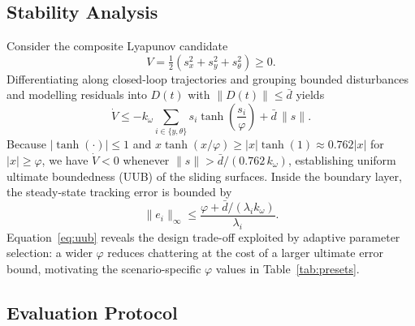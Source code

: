 \documentclass[11pt,a4paper]{article}
\newcommand{\bd}{\bar{d}}
\begin{document}
\subsection{Stability Analysis}

Consider the composite Lyapunov candidate
\begin{equation}
    V = \tfrac{1}{2}\left( s_x^2 + s_y^2 + s_\theta^2 \right) \geq 0 .
    \label{eq:lyapunov}
\end{equation}
Differentiating along closed-loop trajectories and grouping bounded disturbances and
modelling residuals into $D(t)$ with $\|D(t)\| \leq \bd$ yields
\begin{equation}
    \dot{V} \leq -k_\omega \sum_{i \in \{y, \theta\}} s_i
        \tanh\!\left(\frac{s_i}{\varphi}\right) + \bd\, \|s\| .
    \label{eq:vdot}
\end{equation}
Because $|\tanh(\cdot)| \leq 1$ and $x\tanh(x/\varphi) \geq |x|\tanh(1) \approx 0.762|x|$
for $|x| \geq \varphi$, we have $\dot{V} < 0$ whenever $\|s\| > \bd / (0.762\, k_\omega)$,
establishing uniform ultimate boundedness (UUB) of the sliding surfaces. Inside the
boundary layer, the steady-state tracking error is bounded by
\begin{equation}
    \|e_i\|_\infty \leq \frac{\varphi + \bd/(\lambda_i k_\omega)}{\lambda_i} .
    \label{eq:uub}
\end{equation}
Equation~\eqref{eq:uub} reveals the design trade-off exploited by adaptive parameter
selection: a wider $\varphi$ reduces chattering at the cost of a larger ultimate error
bound, motivating the scenario-specific $\varphi$ values in Table~\ref{tab:presets}.

\subsection{Evaluation Protocol}
\end{document}
